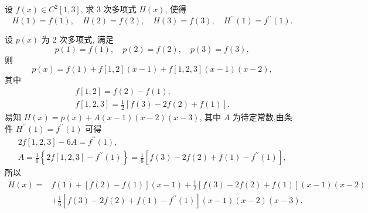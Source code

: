     \begin{tcolorbox}[enhanced,colback=10,colframe=9,breakable,coltitle=green!25!black,title=2024]
 设 $ f(x) \in C^{2}[1,3] $, 求 3 次多项式 $ H(x) $, 使得
$$
H(1)=f(1), \quad H(2)=f(2), \quad H(3)=f(3), \quad H^{\prime \prime}(1)=f^{\prime \prime}(1) .
$$
 \tcblower

设 $ p(x) $ 为 2 次多项式, 满足
$$
p(1)=f(1), \quad p(2)=f(2), \quad p(3)=f(3),
$$
则
$$
p(x)=f(1)+f[1,2](x-1)+f[1,2,3](x-1)(x-2),
$$
其中
$$
\begin{array}{c}
f[1,2]=f(2)-f(1), \\
f[1,2,3]=\frac{1}{2}[f(3)-2 f(2)+f(1)] .
\end{array}
$$
易知
$ H(x)=p(x)+A(x-1)(x-2)(x-3) $, 其中 $ A $ 为待定常数,由条件 $ H^{\prime \prime}(1)=f^{\prime \prime}(1) $ 可得
$$
\begin{array}{c}
2 f[1,2,3]-6 A=f^{\prime \prime}(1), \\
A=\frac{1}{6}\left\{2 f[1,2,3]-f^{\prime \prime}(1)\right\}=\frac{1}{6}\left[f(3)-2 f(2)+f(1)-f^{\prime \prime}(1)\right],
\end{array}
$$
所以
$$
\begin{aligned}
H(x)= & f(1)+[f(2)-f(1)](x-1)+\frac{1}{2}[f(3)-2 f(2)+f(1)](x-1)(x-2) \\
& +\frac{1}{6}\left[f(3)-2 f(2)+f(1)-f^{\prime \prime}(1)\right](x-1)(x-2)(x-3) .
\end{aligned}
$$
 \end{tcolorbox}

